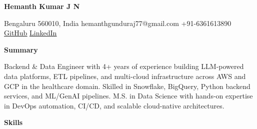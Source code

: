 \documentclass[
]{article}
\author{}
\date{}
\newcommand{\cvsection}[1]{\textbf{#1}}
\begin{document}
\begin{center}{\Large\textbf{Hemanth Kumar J N}}\end{center}

\begin{center}
Bengaluru 560010, India \textbar{} hemanthgunduraj77@gmail.com
\textbar{} +91-6361613890 \textbar{}
\href{https://github.com/hemgowda}{\ul{GitHub}} \textbar{}
\href{https://linkedin.com/in/Hemanthakumar}{\ul{LinkedIn}}
\end{center}

\begin{center}\textbf{Summary}\end{center}
\vspace{-0.5em}

Backend \& Data Engineer with 4+ years of experience building LLM-powered
data platforms, ETL pipelines, and multi-cloud infrastructure across AWS
and GCP in the healthcare domain. Skilled in Snowflake, BigQuery, Python
backend services, and ML/GenAI pipelines. M.S. in Data Science with hands-on expertise in DevOps automation, CI/CD, and scalable
cloud-native architectures.
\vspace{-1.2em}

\begin{center}\cvsection{Skills}\end{center}
\vspace{-0.5em}
\end{document}
